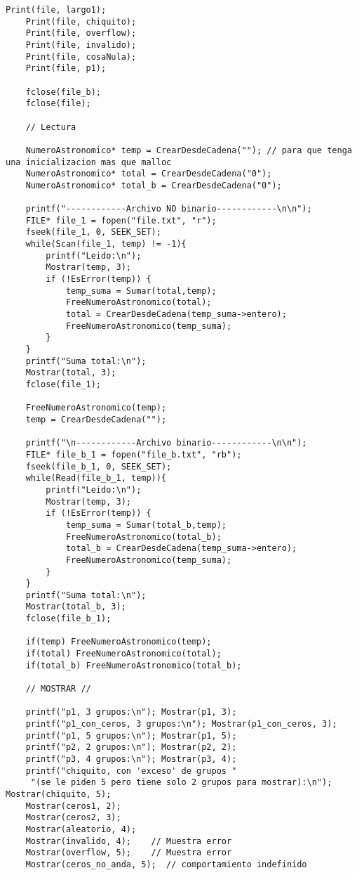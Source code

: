 \documentclass[a4paper, 12pt]{article}
\begin{document}
\begin{lstlisting}[style=C]
    Print(file, largo1);
    Print(file, chiquito);
    Print(file, overflow);
    Print(file, invalido);
    Print(file, cosaNula);
    Print(file, p1);

    fclose(file_b);
    fclose(file);

    // Lectura

    NumeroAstronomico* temp = CrearDesdeCadena(""); // para que tenga una inicializacion mas que malloc
    NumeroAstronomico* total = CrearDesdeCadena("0");
    NumeroAstronomico* total_b = CrearDesdeCadena("0");

    printf("------------Archivo NO binario------------\n\n");
    FILE* file_1 = fopen("file.txt", "r");
    fseek(file_1, 0, SEEK_SET);
    while(Scan(file_1, temp) != -1){
        printf("Leido:\n");
        Mostrar(temp, 3);
        if (!EsError(temp)) {
            temp_suma = Sumar(total,temp);
            FreeNumeroAstronomico(total);
            total = CrearDesdeCadena(temp_suma->entero);
            FreeNumeroAstronomico(temp_suma);
        }
    }
    printf("Suma total:\n");
    Mostrar(total, 3);
    fclose(file_1);

    FreeNumeroAstronomico(temp);
    temp = CrearDesdeCadena("");

    printf("\n------------Archivo binario------------\n\n");
    FILE* file_b_1 = fopen("file_b.txt", "rb");
    fseek(file_b_1, 0, SEEK_SET);
    while(Read(file_b_1, temp)){
        printf("Leido:\n");
        Mostrar(temp, 3);
        if (!EsError(temp)) {
            temp_suma = Sumar(total_b,temp);
            FreeNumeroAstronomico(total_b);
            total_b = CrearDesdeCadena(temp_suma->entero);
            FreeNumeroAstronomico(temp_suma);
        }
    }
    printf("Suma total:\n");
    Mostrar(total_b, 3);
    fclose(file_b_1);

    if(temp) FreeNumeroAstronomico(temp);
    if(total) FreeNumeroAstronomico(total);
    if(total_b) FreeNumeroAstronomico(total_b);
    
    // MOSTRAR //

    printf("p1, 3 grupos:\n"); Mostrar(p1, 3);
    printf("p1_con_ceros, 3 grupos:\n"); Mostrar(p1_con_ceros, 3);
    printf("p1, 5 grupos:\n"); Mostrar(p1, 5);
    printf("p2, 2 grupos:\n"); Mostrar(p2, 2);
    printf("p3, 4 grupos:\n"); Mostrar(p3, 4);
    printf("chiquito, con 'exceso' de grupos "
     "(se le piden 5 pero tiene solo 2 grupos para mostrar):\n"); Mostrar(chiquito, 5);
    Mostrar(ceros1, 2);
    Mostrar(ceros2, 3);
    Mostrar(aleatorio, 4);
    Mostrar(invalido, 4);    // Muestra error
    Mostrar(overflow, 5);    // Muestra error
    Mostrar(ceros_no_anda, 5);  // comportamiento indefinido


\end{lstlisting}
\end{document}
